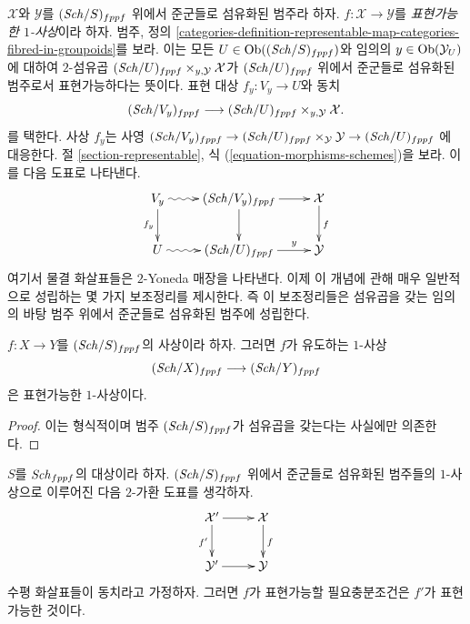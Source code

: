\noindent
$\mathcal{X}$와 $\mathcal{Y}$를 $(\mathit{Sch}/S)_{fppf}$ 위에서 준군들로
섬유화된 범주라 하자. $f : \mathcal{X} \to \mathcal{Y}$를
{\it 표현가능한 $1$-사상}이라 하자. 범주, 정의
\ref{categories-definition-representable-map-categories-fibred-in-groupoids}를
보라. 이는 모든 $U \in \mathop{\mathrm{Ob}}\nolimits((\mathit{Sch}/S)_{fppf})$와 임의의
$y \in \mathop{\mathrm{Ob}}\nolimits(\mathcal{Y}_U)$에 대하여 $2$-섬유곱
$(\mathit{Sch}/U)_{fppf} \times_{y, \mathcal{Y}} \mathcal{X}$가
$(\mathit{Sch}/U)_{fppf}$ 위에서 준군들로 섬유화된 범주로서 표현가능하다는
뜻이다. 표현 대상 $f_y : V_y \to U$와 동치
$$
(\mathit{Sch}/V_y)_{fppf}
\longrightarrow
(\mathit{Sch}/U)_{fppf} \times_{y, \mathcal{Y}} \mathcal{X}.
$$
를 택한다. 사상 $f_y$는 사영
$(\mathit{Sch}/V_y)_{fppf} \to
(\mathit{Sch}/U)_{fppf} \times_\mathcal{Y} \mathcal{Y}
\to (\mathit{Sch}/U)_{fppf}$
에 대응한다. 절 \ref{section-representable}, 식
(\ref{equation-morphisms-schemes})을 보라. 이를 다음 도표로 나타낸다.
\begin{equation}
\label{equation-representable}
\vcenter{
\xymatrix{
V_y \ar@{~>}[r] \ar[d]_{f_y} &
(\Sch/V_y)_{fppf} \ar[d] \ar[r] &
\mathcal{X} \ar[d]^f \\
U \ar@{~>}[r] &
(\Sch/U)_{fppf} \ar[r]^-y &
\mathcal{Y}
}
}
\end{equation}
여기서 물결 화살표들은 $2$-Yoneda 매장을 나타낸다. 이제 이 개념에 관해
매우 일반적으로 성립하는 몇 가지 보조정리를 제시한다. 즉 이 보조정리들은
섬유곱을 갖는 임의의 바탕 범주 위에서 준군들로 섬유화된 범주에 성립한다.

\begin{lemma}
\label{lemma-morphism-schemes-gives-representable-transformation}
$f : X \to Y$를 $(\mathit{Sch}/S)_{fppf}$의 사상이라 하자. 그러면 $f$가
유도하는 $1$-사상
$$
(\mathit{Sch}/X)_{fppf} \longrightarrow (\mathit{Sch}/Y)_{fppf}
$$
은 표현가능한 $1$-사상이다.
\end{lemma}

\begin{proof}
이는 형식적이며 범주 $(\mathit{Sch}/S)_{fppf}$가 섬유곱을 갖는다는 사실에만
의존한다.
\end{proof}

\begin{lemma}
\label{lemma-representable-morphism-equivalent}
$S$를 $\mathit{Sch}_{fppf}$의 대상이라 하자. $(\mathit{Sch}/S)_{fppf}$ 위에서
준군들로 섬유화된 범주들의 $1$-사상으로 이루어진 다음 $2$-가환 도표를
생각하자.
$$
\xymatrix{
\mathcal{X}' \ar[r] \ar[d]_{f'} & \mathcal{X} \ar[d]^f \\
\mathcal{Y}' \ar[r] & \mathcal{Y}
}
$$
수평 화살표들이 동치라고 가정하자. 그러면 $f$가 표현가능할 필요충분조건은
$f'$가 표현가능한 것이다.
\end{lemma}


